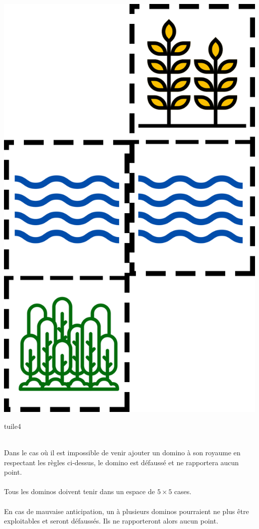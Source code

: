 \begin{center}
  \includegraphics[scale=0.5]{Figures/2tuiles.png}
  \caption{tuile4}
\end{center}
\\
Dans le cas où il est impossible de venir ajouter un domino à son royaume en respectant les règles ci-dessus, le domino est défaussé et ne rapportera aucun point.\\\\
Tous les dominos doivent tenir dans un espace de $ 5 \times 5$ cases.\\\\
En cas de mauvaise anticipation, un à plusieurs dominos pourraient ne plus être exploitables et seront défaussés. Ils ne rapporteront alors aucun point.

